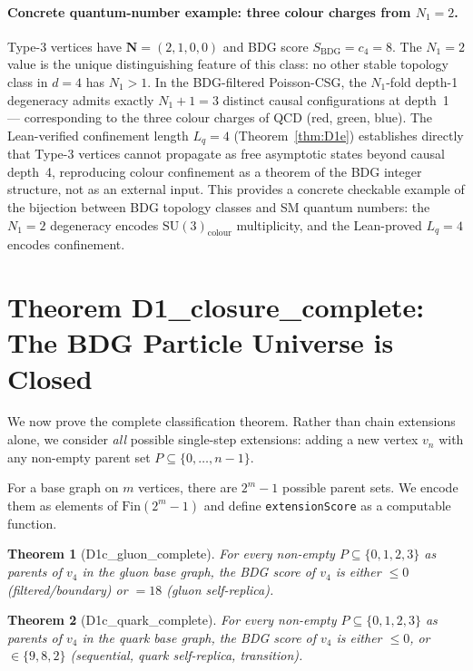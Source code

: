 \documentclass[11pt,a4paper]{article}
\newtheorem{theorem}{Theorem}[section]
\begin{document}
\paragraph{Concrete quantum-number example: three colour charges from $N_1 = 2$.}
Type-3 vertices have $\mathbf{N} = (2,1,0,0)$ and BDG score
$S_{\mathrm{BDG}} = c_4 = 8$.
The $N_1 = 2$ value is the unique distinguishing feature of this class:
no other stable topology class in $d=4$ has $N_1 > 1$.
In the BDG-filtered Poisson-CSG, the $N_1$-fold depth-1 degeneracy
admits exactly $N_1 + 1 = 3$ distinct causal configurations
at depth~1 — corresponding to the three colour charges of QCD (red,
green, blue).
The Lean-verified confinement length $L_q = 4$
(Theorem~\ref{thm:D1e}) establishes directly that Type-3 vertices
cannot propagate as free asymptotic states beyond causal depth~4,
reproducing colour confinement as a theorem of the BDG integer
structure, not as an external input.
This provides a concrete checkable example of the bijection between
BDG topology classes and SM quantum numbers: the $N_1 = 2$
degeneracy encodes $\mathrm{SU}(3)_{\mathrm{colour}}$
multiplicity, and the Lean-proved $L_q = 4$ encodes confinement.

\section{Theorem D1\_closure\_complete: The BDG Particle Universe is Closed}
\label{sec:closure}

We now prove the complete classification theorem. Rather than chain
extensions alone, we consider \emph{all} possible single-step
extensions: adding a new vertex $v_n$ with any non-empty parent set
$P \subseteq \{0,\ldots,n-1\}$.

For a base graph on $m$ vertices, there are $2^m - 1$ possible parent
sets. We encode them as elements of $\mathrm{Fin}(2^m-1)$ and define
\texttt{extensionScore} as a computable function.

\begin{theorem}[D1c\_gluon\_complete]
\label{thm:gluon_complete}
For every non-empty $P \subseteq \{0,1,2,3\}$ as parents of $v_4$ in
the gluon base graph, the BDG score of $v_4$ is either $\leq 0$
(filtered/boundary) or $= 18$ (gluon self-replica).
\end{theorem}

\begin{theorem}[D1c\_quark\_complete]
\label{thm:quark_complete}
For every non-empty $P \subseteq \{0,1,2,3\}$ as parents of $v_4$ in
the quark base graph, the BDG score of $v_4$ is either $\leq 0$,
or $\in \{9, 8, 2\}$ (sequential, quark self-replica, transition).
\end{theorem}
\end{document}
